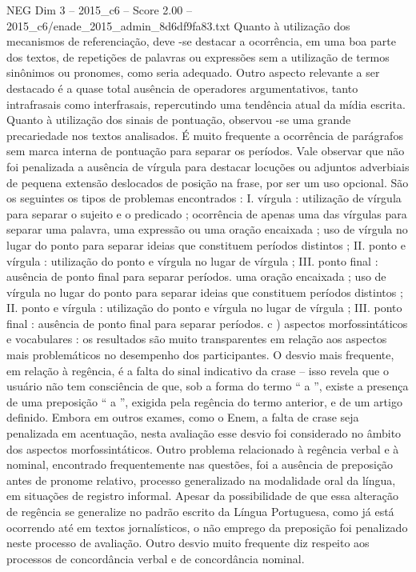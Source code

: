\begin{textsample}{NEG Dim 3 – 2015\_c6 – Score 2.00 – 2015\_c6/enade\_2015\_admin\_8d6df9fa83.txt}
Quanto à utilização dos mecanismos de referenciação, deve -se destacar a ocorrência, em uma boa parte dos textos, de repetições de palavras ou expressões sem a utilização de termos sinônimos ou pronomes, como seria adequado.
Outro aspecto relevante a ser destacado é a quase total ausência de operadores argumentativos, tanto intrafrasais como interfrasais, repercutindo uma tendência atual da mídia escrita.
Quanto à utilização dos sinais de pontuação, observou -se uma grande precariedade nos textos analisados.
É muito frequente a ocorrência de parágrafos sem marca interna de pontuação para separar os períodos.
Vale observar que não foi penalizada a ausência de vírgula para destacar locuções ou adjuntos adverbiais de pequena extensão deslocados de posição na frase, por ser um uso opcional.
São os seguintes os tipos de problemas encontrados : I. vírgula : utilização de vírgula para separar o sujeito e o predicado ; ocorrência de apenas uma das vírgulas para separar uma palavra, uma expressão ou uma oração encaixada ; uso de vírgula no lugar do ponto para separar ideias que constituem períodos distintos ; II. ponto e vírgula : utilização do ponto e vírgula no lugar de vírgula ; III. ponto final : ausência de ponto final para separar períodos. uma oração encaixada ; uso de vírgula no lugar do ponto para separar ideias que constituem períodos distintos ; II. ponto e vírgula : utilização do ponto e vírgula no lugar de vírgula ; III. ponto final : ausência de ponto final para separar períodos. c ) aspectos morfossintáticos e vocabulares : os resultados são muito transparentes em relação aos aspectos mais problemáticos no desempenho dos participantes.
O desvio mais frequente, em relação à regência, é a falta do sinal indicativo da crase – isso revela que o usuário não tem consciência de que, sob a forma do termo “ a ”, existe a presença de uma preposição “ a ”, exigida pela regência do termo anterior, e de um artigo definido.
Embora em outros exames, como o Enem, a falta de crase seja penalizada em acentuação, nesta avaliação esse desvio foi considerado no âmbito dos aspectos morfossintáticos.
Outro problema relacionado à regência verbal e à nominal, encontrado frequentemente nas questões, foi a ausência de preposição antes de pronome relativo, processo generalizado na modalidade oral da língua, em situações de registro informal.
Apesar da possibilidade de que essa alteração de regência se generalize no padrão escrito da Língua Portuguesa, como já está ocorrendo até em textos jornalísticos, o não emprego da preposição foi penalizado neste processo de avaliação.
Outro desvio muito frequente diz respeito aos processos de concordância verbal e de concordância nominal.

\end{textsample}
